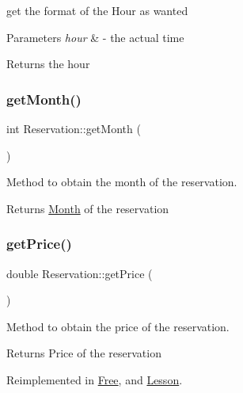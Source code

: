 get the format of the Hour as wanted 


\begin{DoxyParams}{Parameters}
{\em hour} & -\/ the actual time \\
\hline
\end{DoxyParams}
\begin{DoxyReturn}{Returns}
the hour 
\end{DoxyReturn}
\mbox{\label{class_reservation_adbc454654e7e861d80c8740f85e0fb10}} 
\subsubsection{\texorpdfstring{get\+Month()}{getMonth()}}
{\footnotesize\ttfamily int Reservation\+::get\+Month (\begin{DoxyParamCaption}{ }\end{DoxyParamCaption})}



Method to obtain the month of the reservation. 

\begin{DoxyReturn}{Returns}
\mbox{\hyperlink{class_month}{Month}} of the reservation 
\end{DoxyReturn}
\mbox{\label{class_reservation_a62cdb2f1a24e2fce92fb9f024ae9f494}} 
\subsubsection{\texorpdfstring{get\+Price()}{getPrice()}}
{\footnotesize\ttfamily double Reservation\+::get\+Price (\begin{DoxyParamCaption}{ }\end{DoxyParamCaption})\hspace{0.3cm}{\ttfamily [virtual]}}



Method to obtain the price of the reservation. 

\begin{DoxyReturn}{Returns}
Price of the reservation 
\end{DoxyReturn}


Reimplemented in \mbox{\hyperlink{class_free_a229f009a7535eeba0a6ff4495de8c6bf}{Free}}, and \mbox{\hyperlink{class_lesson_ad7a2f708f870040627a442cdf000683f}{Lesson}}.

